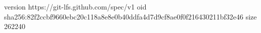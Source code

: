 version https://git-lfs.github.com/spec/v1
oid sha256:82f2ccbf9660ebc20c118a8e8e0b40ddfa4d7d9cf8ae0f0f216430211bf32e46
size 262240
